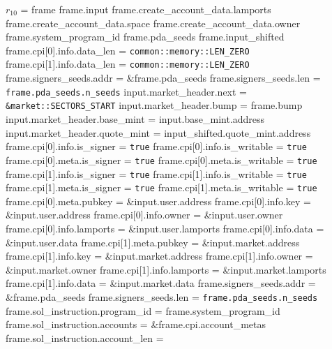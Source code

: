 \begin{algorithm}
\caption{CREATE-MARKET-ACCOUNT}
\begin{algorithmic}
  \INPUT $r_{10}$ = frame
  \REQUIRE frame.input
  \REQUIRE frame.create\_account\_data.lamports
  \REQUIRE frame.create\_account\_data.space
  \REQUIRE frame.create\_account\_data.owner
  \REQUIRE frame.system\_program\_id
  \REQUIRE frame.pda\_seeds
  \REQUIRE frame.input\_shifted
  \REQUIRE frame.cpi[0].info.data\_len = \texttt{common::memory::LEN\_ZERO}
  \REQUIRE frame.cpi[1].info.data\_len = \texttt{common::memory::LEN\_ZERO}
  \ENSURE frame.signers\_seeds.addr = \&frame.pda\_seeds
  \ENSURE frame.signers\_seeds.len = \texttt{frame.pda\_seeds.n\_seeds}
  \ENSURE input.market\_header.next = \texttt{\&market::SECTORS\_START}
  \ENSURE input.market\_header.bump = frame.bump
  \ENSURE input.market\_header.base\_mint = input.base\_mint.address
  \ENSURE input.market\_header.quote\_mint = input\_shifted.quote\_mint.address
  \STATE frame.cpi[0].info.is\_signer = \texttt{true}
  \STATE frame.cpi[0].info.is\_writable = \texttt{true}
  \STATE frame.cpi[0].meta.is\_signer = \texttt{true}
  \STATE frame.cpi[0].meta.is\_writable = \texttt{true}
  \STATE frame.cpi[1].info.is\_signer = \texttt{true}
  \STATE frame.cpi[1].info.is\_writable = \texttt{true}
  \STATE frame.cpi[1].meta.is\_signer = \texttt{true}
  \STATE frame.cpi[1].meta.is\_writable = \texttt{true}
  \STATE frame.cpi[0].meta.pubkey = \&input.user.address
  \STATE frame.cpi[0].info.key = \&input.user.address
  \STATE frame.cpi[0].info.owner = \&input.user.owner
  \STATE frame.cpi[0].info.lamports = \&input.user.lamports
  \STATE frame.cpi[0].info.data = \&input.user.data
  \STATE frame.cpi[1].meta.pubkey = \&input.market.address
  \STATE frame.cpi[1].info.key = \&input.market.address
  \STATE frame.cpi[1].info.owner = \&input.market.owner
  \STATE frame.cpi[1].info.lamports = \&input.market.lamports
  \STATE frame.cpi[1].info.data = \&input.market.data
  \STATE frame.signers\_seeds.addr = \&frame.pda\_seeds
  \STATE frame.signers\_seeds.len = \texttt{frame.pda\_seeds.n\_seeds}
  \STATE frame.sol\_instruction.program\_id = frame.system\_program\_id
  \STATE frame.sol\_instruction.accounts = \&frame.cpi.account\_metas
  \STATE frame.sol\_instruction.account\_len =

\end{algorithmic}
\end{algorithm}
